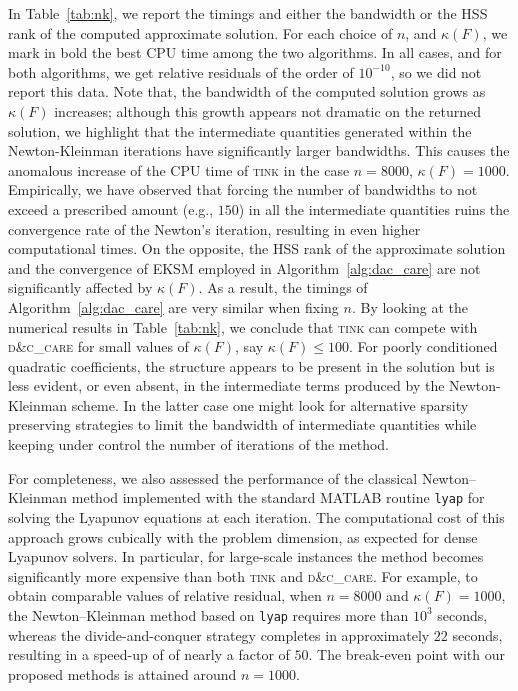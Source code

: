 \documentclass[a4paper,10pt]{article}
\newcommand{\upd}[1]{{\color{black}#1}} %
\begin{document}
In Table~\ref{tab:nk},  we report the timings and either the bandwidth or the HSS rank of the computed approximate solution. For each choice of $n$, and $\kappa(F)$, we mark in bold the best CPU time among the two algorithms.  In all cases, and for both algorithms, we get relative residuals of the order of $10^{-10}$, so we did not report this data. Note that, the bandwidth of the computed solution grows as $\kappa(F)$ increases; although this growth appears not dramatic on the returned solution, we highlight that the intermediate quantities generated within the Newton-Kleinman iterations have significantly larger bandwidths. This causes the anomalous increase of the CPU time of \textsc{tink} in the case $n=8000$, $\kappa(F)=1000$. Empirically, we have observed that forcing the number of bandwidths to not exceed a prescribed amount (e.g., $150$) in all the intermediate quantities ruins the convergence rate of the Newton's iteration, resulting in even higher computational times. On the opposite, the HSS rank of the approximate solution and the convergence of EKSM employed in Algorithm~\ref{alg:dac_care} are not significantly affected by $\kappa(F)$. As a result, the timings of  Algorithm~\ref{alg:dac_care} are very similar when fixing $n$. By looking at the numerical results in Table~\ref{tab:nk}, we conclude that \textsc{tink} can compete with \textsc{d\&c\_care} for small values of $\kappa(F)$, say $\kappa(F)\le 100$. For poorly conditioned quadratic coefficients, the structure appears to be present in the solution but is less evident, or even absent, in the intermediate terms produced by the Newton-Kleinman scheme. In the latter case one might look for alternative sparsity preserving strategies to limit the bandwidth of intermediate quantities while keeping under control the number of iterations of the method. 

\upd{For completeness, we also assessed the performance of the classical Newton–Kleinman method implemented with the standard MATLAB routine \texttt{lyap} for solving the Lyapunov equations at each iteration. The computational cost of this approach grows cubically with the problem dimension, as expected for dense Lyapunov solvers. In particular,  for large-scale instances the method becomes significantly more expensive than both \textsc{tink} and \textsc{d\&c\_care}. For example, to obtain comparable values of relative residual, when $n=8000$ and $\kappa(F)=1000$, the Newton–Kleinman method based on \texttt{lyap} requires more than $10^3$ seconds, whereas the divide-and-conquer strategy completes in approximately $22$ seconds, resulting in a speed-up of of nearly a factor of $50$. The break-even point with our proposed methods is attained around $n=1000$. %
}
\end{document}
